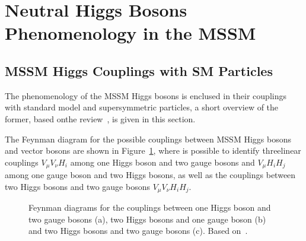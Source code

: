 \section{Neutral Higgs Bosons Phenomenology in the MSSM}

\subsection{MSSM Higgs Couplings with SM Particles}
The phenomenology of the MSSM Higgs bosons is enclused in their couplings with standard model and supersymmetric particles, 
a short overview of the former, based onthe review~\cite{Djuadi}, is given in this section.

The Feynman diagram for the possible couplings between MSSM Higgs bosons and vector bosons are shown in Figure~\ref{fig:couplings}, where is possible to identify threelinear 
couplings $V_{\mu}V_{\nu}H_i$ among one Higgs boson and two gauge bosons and $V_{\mu}H_{i}H_j$ among one gauge boson and two Higgs bosons,
as well as the couplings between two Higgs bosons and two gauge bosons $V_{\mu}V_{\nu}H_iH_j$.
\begin{figure}[tp]
     \begin{center}
     \end{center}
   \label{fig:couplings}
    \caption{Feynman diagrams for the couplings between one Higgs boson and two gauge bosons (a), two Higgs bosons and one gauge boson (b)
		and two Higgs bosons and two gauge bosons (c). Based on~\cite{Djuadi}. }
\end{figure}
